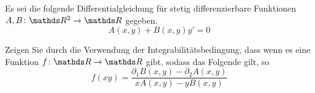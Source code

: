 \begin{atiTask}[
  title = Spezielle integrierende Faktoren
  ]
  Es sei die folgende Differentialgleichung für stetig differenzierbare Funktionen $\func{A,B}{\setR^2}{\setR}$ gegeben.
  \[
    A(x,y) + B(x,y)y' = 0
  \]
  \begin{atiSubtasks}
    \item{
      Zeigen Sie durch die Verwendung der Integrabilitätsbedingung, dass wenn es eine Funktion $\func{f}{\setR}{\setR}$ gibt, sodass das Folgende gilt, so
      \[
        f(xy) = \frac{\partial_1B(x,y) - \partial_2A(x,y)}{xA(x,y)-yB(x,y)}
      \]
    }
  \end{atiSubtasks}
\end{atiTask}